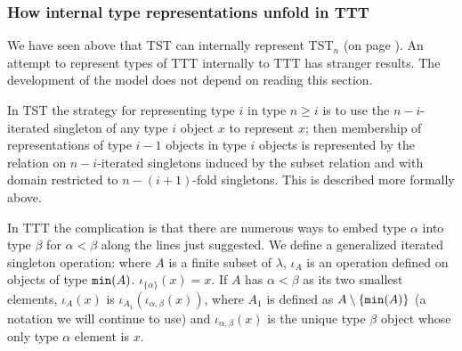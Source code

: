 \documentclass[112pt]{article}
\theoremstyle{definition}
\theoremstyle{remark}
\begin{document}
\newpage



\subsubsection{How internal type representations unfold in TTT}

We have seen above that TST can internally represent TST$_n$ (on page \pageref{tstnmodel}).   An attempt to represent types of TTT internally to TTT has stranger results.  The development of the model does not depend on reading this section.

In TST the strategy for representing type $i$ in type $n\geq i$  is to use the $n-i$-iterated singleton of any type $i$ object $x$ to represent $x$;  then membership of representations of type $i-1$ objects in type
$i$ objects is represented by the relation on $n-i$-iterated singletons induced by the subset relation and with domain restricted to $n-(i+1)$-fold singletons.  This is described more formally above.

In TTT the complication is that there are numerous ways to embed type $\alpha$ into type $\beta$ for $\alpha<\beta$ along the lines just suggested.    We define a generalized
iterated singleton operation:  where $A$ is a finite subset of $\lambda$, $\iota_A$ is an operation defined on objects of type ${\tt min}(A)$.  $\iota_{\{\alpha\}}(x)=x$.
If $A$ has $\alpha<\beta$ as its two smallest elements, $\iota_A(x)$ is  $\iota_{A_1}(\iota_{\alpha,\beta}(x))$, where $A_1$ is defined as $A \setminus \{{\tt min}(A)\}$ (a notation we will continue to use) and $\iota_{\alpha,\beta}(x)$ is the unique type $\beta$ object whose only type $\alpha$ element is $x$.
\end{document}
